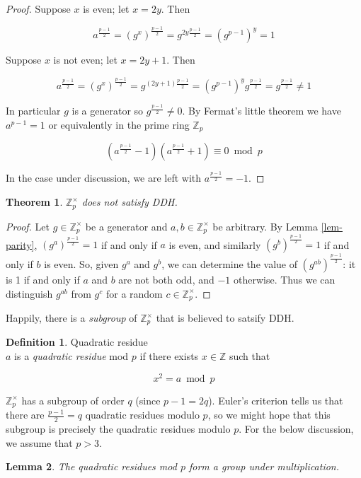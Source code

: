 \documentclass[11pt,twoside,a4paper]{article}
\newtheorem{theorem}{Theorem}[section]
\newtheorem{lemma}[theorem]{Lemma}
\theoremstyle{definition}
\newtheorem{definition}{Definition}[section]
\begin{document}
\begin{proof}
    Suppose \(x\) is even; let \(x=2y\). Then

    \[a^{\frac{p-1}{2}}=(g^x)^{\frac{p-1}{2}}=g^{2y\frac{p-1}{2}}=(g^{p-1})^y=1\]

    Suppose \(x\) is not even; let \(x=2y+1\). Then

    \[a^{\frac{p-1}{2}}=(g^x)^{\frac{p-1}{2}}=g^{(2y+1)\frac{p-1}{2}}=(g^{p-1})^yg^{\frac{p-1}{2}}=g^{\frac{p-1}{2}}\neq 1\]

    In particular \(g\) is a generator so \(g^\frac{p-1}{2}\neq 0\). By Fermat's little theorem we have \(a^{p-1}=1\) or equivalently in the prime ring \(\mathbb{Z}_p\)

    \[\left(a^\frac{p-1}{2}-1\right)\left(a^\frac{p-1}{2}+1\right)\equiv 0\bmod p\]
    
    In the case under discussion, we are left with \(a^\frac{p-1}{2}=-1\).
\end{proof}
\begin{theorem}
    \(\mathbb{Z}^\times_p\) does not satisfy DDH.
\end{theorem}
\begin{proof}
    Let \(g\in\mathbb{Z}^\times_p\) be a generator and \(a,b\in\mathbb{Z}^\times_p\) be arbitrary. By Lemma \ref{lem-parity}, \((g^a)^{\frac{p-1}{2}}=1\) if and only if \(a\) is even, and similarly \((g^b)^{\frac{p-1}{2}}=1\) if and only if \(b\) is even. So, given \(g^a\) and \(g^b\), we can determine the value of \(\left(g^{ab}\right)^\frac{p-1}{2}\): it is 1 if and only if \(a\) and \(b\) are not both odd, and \(-1\) otherwise. Thus we can distinguish \(g^{ab}\) from \(g^c\) for a random \(c\in\mathbb{Z}^\times_p\).
\end{proof}
Happily, there is a \textit{subgroup} of \(\mathbb{Z}^\times_p\) that is believed to satsify DDH.
\begin{definition}{Quadratic residue}\\
    \(a\) is a \textit{quadratic residue} mod \(p\) if there exists \(x\in\mathbb{Z}\) such that

    \[x^2=a\bmod p\]

\end{definition}
\(\mathbb{Z}^\times_p\) has a subgroup of order \(q\) (since \(p-1=2q\)). Euler's criterion tells us that there are \(\frac{p-1}{2}=q\) quadratic residues modulo \(p\), so we might hope that this subgroup is precisely the quadratic residues modulo \(p\). For the below discussion, we assume that \(p>3\).
\begin{lemma}
    The quadratic residues mod \(p\) form a group under multiplication.
\end{lemma}
\end{document}
